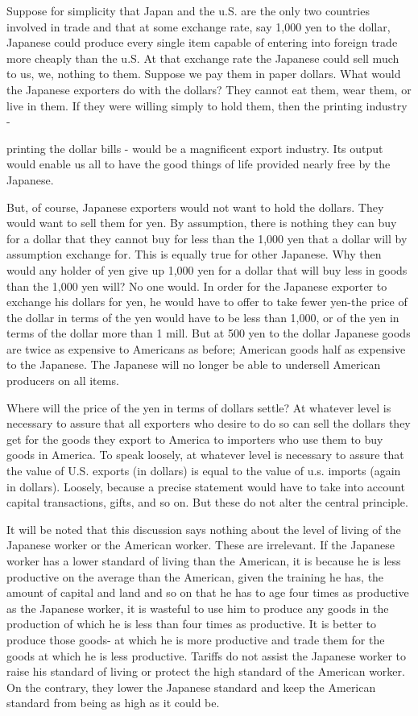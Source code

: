 \documentclass[11pt,openany]{book}
\begin{document}
Suppose for simplicity that Japan and the u.S. are the only two countries involved in trade and that at some exchange rate, say 1,000 yen to the dollar, Japanese could produce every single item capable of entering into foreign trade more cheaply than the u.S. At that exchange rate the Japanese could sell much to us, we, nothing to them. Suppose we pay them in paper dollars. What would the Japanese exporters do with the dollars? They cannot eat them, wear them, or live in them. If they were willing simply to hold them, then the printing industry -

printing the dollar bills - would be a magnificent export industry. Its output would enable us all to have the good things of life provided nearly free by the Japanese.

But, of course, Japanese exporters would not want to hold the dollars. They would want to sell them for yen. By assumption, there is nothing they can buy for a dollar that they cannot buy for less than the 1,000 yen that a dollar will by assumption exchange for. This is equally true for other Japanese. Why then would any holder of yen give up 1,000 yen for a dollar that will buy less in goods than the 1,000 yen will? No one would. In order for the Japanese exporter to exchange his dollars for yen, he would have to offer to take fewer yen-the price of the dollar in terms of the yen would have to be less than 1,000, or of the yen in terms of the dollar more than 1 mill. But at 500 yen to the dollar Japanese goods are twice as expensive to Americans as before; American goods half as expensive to the Japanese. The Japanese will no longer be able to undersell American producers on all items.

Where will the price of the yen in terms of dollars settle? At whatever level is necessary to assure that all exporters who desire to do so can sell the dollars they get for the goods they export to America to importers who use them to buy goods in America. To speak loosely, at whatever level is necessary to assure that the value of U.S. exports (in dollars) is equal to the value of u.s. imports (again in dollars). Loosely, because a precise statement would have to take into account capital transactions, gifts, and so on. But these do not alter the central principle.

It will be noted that this discussion says nothing about the level of living of the Japanese worker or the American worker. These are irrelevant. If the Japanese worker has a lower standard of living than the American, it is because he is less productive on the average than the American, given the training he has, the amount of capital and land and so on that he has to age four times as productive as the Japanese worker, it is wasteful to use him to produce any goods in the production of which he is less than four times as productive. It is better to produce those goods- at which he is more productive and trade them for the goods at which he is less productive. Tariffs do not assist the Japanese worker to raise his standard of living or protect the high standard of the American worker. On the contrary, they lower the Japanese standard and keep the American standard from being as high as it could be.
\end{document}
